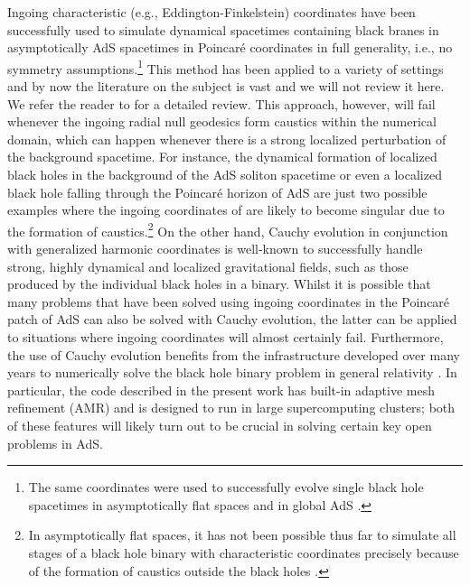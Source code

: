 \documentclass[a4paper,11pt]{article}
\numberwithin{equation}{section}
\begin{document}
Ingoing characteristic (e.g., Eddington-Finkelstein) coordinates have been successfully used to simulate dynamical spacetimes containing black branes in asymptotically AdS spacetimes in Poincar\'{e} coordinates in full generality, i.e., no symmetry assumptions.\footnote{The same coordinates were used to successfully evolve single black hole spacetimes in asymptotically flat spaces \cite{Gomez:1998uj} and in global AdS \cite{Chesler:2018txn}.} This method has been applied to a variety of settings and by now the literature on the subject is vast and we will not review it here. We refer the reader to \cite{Chesler:2013lia} for a detailed review. This approach, however, will fail whenever the ingoing radial null geodesics form caustics within the numerical domain, which can happen whenever there is a strong localized perturbation of the background spacetime. For instance, the dynamical formation of localized black holes in the background of the AdS soliton spacetime \cite{Bantilan:2020pay} or even a localized black hole falling through the Poincar\'{e} horizon of AdS are just two possible examples where the ingoing coordinates of \cite{Chesler:2013lia} are likely to become singular due to the formation of caustics.\footnote{In asymptotically flat spaces, it has not been possible thus far to simulate all stages of a black hole binary with characteristic coordinates precisely because of the formation of caustics outside the black holes \cite{Bishop:1997ik,Lehner:2001wq}.} 
On the other hand, Cauchy evolution in conjunction with generalized harmonic coordinates is well-known to successfully handle strong, highly dynamical and localized gravitational fields, such as those produced by the individual black holes in a binary. 
Whilst it is possible that many problems that have been solved using ingoing coordinates in the Poincar\'{e} patch of AdS can also be solved with Cauchy evolution, the latter can be applied to situations where ingoing coordinates will almost certainly fail. Furthermore, the use of Cauchy evolution benefits from the infrastructure developed over many years to numerically solve the black hole binary problem in general relativity \cite{Pretorius:2005gq,Campanelli:2005dd,Baker:2005vv}. 
In particular, the code described in the present work has built-in adaptive mesh refinement (AMR) and is designed to run in large supercomputing clusters; both of these features will likely turn out to be crucial in solving certain key open problems in AdS. 
\end{document}
